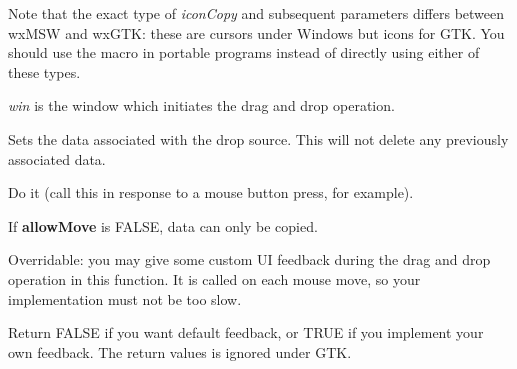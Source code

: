 Note that the exact type of {\it iconCopy} and subsequent parameters differs
between wxMSW and wxGTK: these are cursors under Windows but icons for GTK.
You should use the macro  in portable
programs instead of directly using either of these types.






{\it win} is the window which initiates the drag and drop operation.

\label{wxdropsourcedtor}


\label{wxdropsourcesetdata}


Sets the data  associated with the 
drop source. This will not delete any previously associated data.

\label{wxdropsourcedodragdrop}


Do it (call this in response to a mouse button press, for example).

If {\bf allowMove} is FALSE, data can only be copied.

\label{wxdropsourcegivefeedback}


Overridable: you may give some custom UI feedback during the drag and drop operation
in this function. It is called on each mouse move, so your implementation must not be too
slow.





Return FALSE if you want default feedback, or TRUE if you implement your own
feedback. The return values is ignored under GTK.

